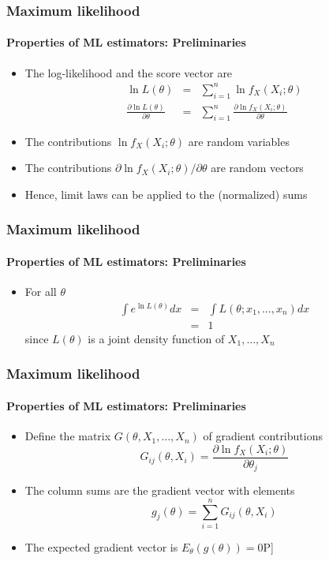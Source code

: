 \documentclass[notes=show]{beamer}
\begin{document}
\begin{frame}\frametitle{Maximum likelihood}\framesubtitle{Properties of ML estimators: Preliminaries}
\begin{itemize}
    \item The log-likelihood and the score vector are
    \begin{eqnarray*}
        \ln L\left( \theta \right) &=&\sum_{i=1}^{n}\ln f_{X}(X_{i};\theta ) \\
        \frac{\partial \ln L\left( \theta \right) }{\partial \theta } &=&\sum_{i=1}^{n}\frac{\partial \ln f_{X}(X_{i};\theta )}{\partial \theta }
    \end{eqnarray*}
    \item The contributions $\ln f_{X}(X_{i};\theta )$ are random variables
    \item The contributions $\partial \ln f_{X}(X_{i};\theta )/\partial \theta $ are random vectors
    \item Hence, limit laws can be applied to the (normalized) sums
\end{itemize}
\end{frame}


\begin{frame}\frametitle{Maximum likelihood}\framesubtitle{Properties of ML estimators: Preliminaries}
\begin{itemize}
    \item For all $\theta $
    \begin{eqnarray*}
        \int e^{\ln L\left( \theta \right) }dx &=&\int L\left( \theta ;x_{1},\ldots,x_{n}\right) dx \\
        &=&1
    \end{eqnarray*}
    since $L\left( \theta \right) $ is a joint density function of $X_{1},\ldots,X_{n}$
\end{itemize}
\end{frame}


\begin{frame}\frametitle{Maximum likelihood}\framesubtitle{Properties of ML estimators: Preliminaries}
\begin{itemize}
    \item Define the matrix $G\left( \theta ,X_{1},\ldots ,X_{n}\right) $ of gradient contributions
    \begin{equation*}
        G_{ij}\left( \theta ,X_{i}\right) =\frac{\partial \ln f_{X}(X_{i};\theta )}{\partial \theta _{j}}
    \end{equation*}
    \item The column sums are the gradient vector with elements
    \begin{equation*}
        g_{j}\left( \theta \right) =\sum_{i=1}^{n}G_{ij}\left( \theta ,X_{i}\right)
    \end{equation*}
    \item The expected gradient vector is $E_{\theta }\left( g\left( \theta \right) \right) =0$\hfill \lbrack P]
\end{itemize}
\end{frame}
\end{document}

